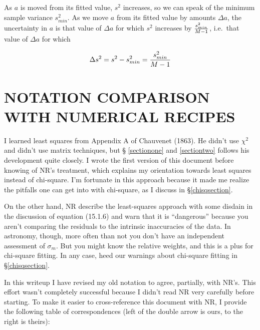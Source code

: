 \documentclass[psfig,preprint]{aastex}
\begin{document}
\noindent As $a$ is moved from its fitted value, $s^2$ increases, so we
can speak of the minimum sample variance $s_{min}^2$. As we move $a$
from its fitted value by amounts $\Delta a$, the uncertainty in $a$ is
that value of $\Delta a$ for which $s^2$ increases by $s_{min}^2 \over
M-1$, i.e.\ that value of $\Delta a$ for which

\begin{equation}
\Delta s^2 = s^2 - s_{min}^2 = {s_{min}^2 \over M-1}
\end{equation}

\section{ NOTATION COMPARISON WITH NUMERICAL RECIPES}

	I learned least squares from Appendix A of Chauvenet (1863). He
didn't use $\chi^2$ and didn't use matrix techniques, but \S
\ref{sectionone} and \ref{sectiontwo} follows his development quite
closely. I wrote the first version of this document before knowing of
NR's treatment, which explains my orientation towards least squares
instead of chi-square. I'm fortunate in this approach because it made me
realize the pitfalls one can get into with chi-square, as I discuss in
\S \ref{chisqsection}. 

	On the other hand, NR describe the least-squares approach with
some disdain in the discussion of equation (15.1.6) and warn that it is
``dangerous'' because you aren't comparing the residuals to the
intrinsic inaccuracies of the data.  In astronomy, though, more often
than not you don't have an independent assessment of $\sigma_{m}$. 
But you might know the relative weights, and this is a plus for
chi-square fitting.  In any case, heed our warnings about chi-square
fitting in \S \ref{chisqsection}. 

	In this writeup I have revised my old notation to agree,
partially, with NR's. This effort wasn't completely successful because I
didn't read NR very carefully before starting. To make it easier to
cross-reference this document with NR, I provide the following table of
correspondences (left of the double arrow is ours, to the right is
theirs): 
\end{document}

